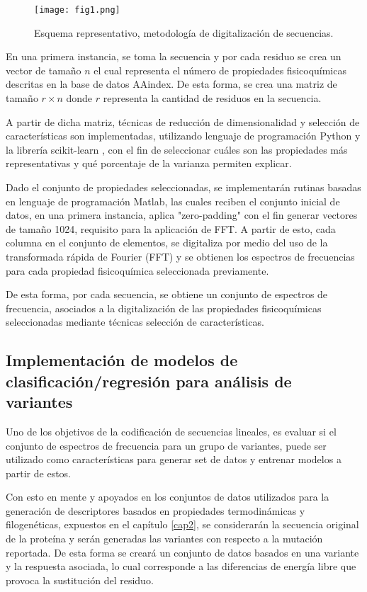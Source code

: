 \begin{figure}[!h]
	
	\centering
	\texttt{[image: fig1.png]}
	\caption{Esquema representativo, metodología de digitalización de secuencias.}
	\label{cap3:fig1}
\end{figure}

En una primera instancia, se toma la secuencia y por cada residuo se crea un vector de tamaño $n$ el cual representa el número de propiedades fisicoquímicas descritas en la base de datos AAindex. De esta forma, se crea una matriz de tamaño $r \times n$ donde $r$ representa la cantidad de residuos en la secuencia.


A partir de dicha matriz, técnicas de reducción de dimensionalidad y selección de características son implementadas, utilizando lenguaje de programación Python y la librería scikit-learn \cite{pedregosa2011scikit}, con el fin de seleccionar cuáles son las propiedades más representativas y qué porcentaje de la varianza permiten explicar.

Dado el conjunto de propiedades seleccionadas, se implementarán rutinas basadas en lenguaje de programación Matlab, las cuales reciben el conjunto inicial de datos, en una primera instancia, aplica "zero-padding" con el fin generar vectores de tamaño 1024, requisito para la aplicación de FFT. A partir de esto, cada columna en el conjunto de elementos, se digitaliza por medio del uso de la transformada rápida de Fourier (FFT) y se obtienen los espectros de frecuencias para cada propiedad fisicoquímica seleccionada previamente.

De esta forma, por cada secuencia, se obtiene un conjunto de espectros de frecuencia, asociados a la digitalización de las propiedades fisicoquímicas seleccionadas mediante técnicas selección de características.

\subsection{Implementación de modelos de clasificación/regresión para análisis de variantes}

Uno de los objetivos de la codificación de secuencias lineales, es evaluar si el conjunto de espectros de frecuencia para un grupo de variantes, puede ser utilizado como características para generar set de datos y entrenar modelos a partir de estos.

Con esto en mente y apoyados en los conjuntos de datos utilizados para la generación de descriptores basados en propiedades termodinámicas y filogenéticas, expuestos en el capítulo \ref{cap2}, se considerarán la secuencia original de la proteína y serán generadas las variantes con respecto a la mutación reportada. De esta forma se creará un conjunto de datos basados en una variante y la respuesta asociada, lo cual corresponde a las diferencias de energía libre que provoca la sustitución del residuo.

